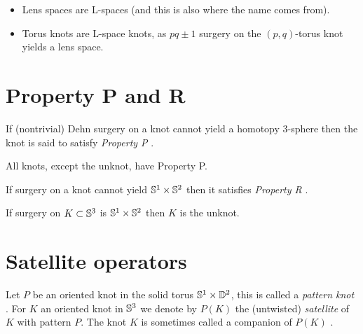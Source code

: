 \begin{example}
	\begin{itemize}
		\item Lens spaces are L-spaces (and this is also where the
		name comes from).
		
		\item Torus knots are L-space knots, as
		$pq \pm 1$ surgery on the $(p,q)$-torus knot yields a
		lens space. 
	\end{itemize}
\end{example}


\newpage
\section{Property P and R}

\begin{definition}
	If (nontrivial) Dehn surgery on a knot
	cannot yield a homotopy $3$-sphere
	then the knot is said to satisfy
	\textit{Property P} .
\end{definition}

\begin{theorem}
	All knots, except the unknot, have Property P.
\end{theorem}

\begin{definition}[Property R]
	If surgery on a knot cannot yield
	$\mathbb{S}^{1} \times \mathbb{S}^{2}$ then it
	satisfies
	\textit{Property R} .
\end{definition}

\begin{theorem}[Gabai]
	If surgery on $K \subset \mathbb{S}^{3}$ is 
	$\mathbb{S}^{1} \times \mathbb{S}^{2}$
	then $K$ is the unknot.
\end{theorem}


\newpage
\section{Satellite operators}

\citep{cochran2014injectivity}

Let $P$ be an oriented knot in the solid torus $\mathbb{S}^{1} \times \mathbb{D}^{2}$,
this is called a \textit{pattern knot} .
For $K$ an oriented knot in $\mathbb{S}^{3}$ we denote by $P(K)$
the (untwisted) \textit{satellite}  of $K$
with pattern $P$. The knot $K$ is sometimes called
a companion
of $P(K)$ \citep[p. 10]{lickorish2012introduction}.

